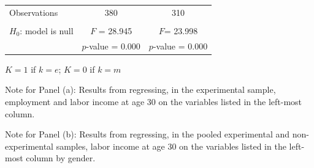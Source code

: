 \begin{table}[!htpb]
\begin{threeparttable}
\begin{tabular}{lcccc}
Observations & \multicolumn{2}{c}{380} & \multicolumn{2}{c}{310} \\ \\
$H_0$: model is null & \multicolumn{2}{c}{$F$ = 28.945} & \multicolumn{2}{c}{$F$= 23.998} \\
& \multicolumn{2}{c}{$p$-value = 0.000} & \multicolumn{2}{c}{$p$-value = 0.000} \\ \bottomrule
\end{tabular}
\begin{tablenotes}
\footnotesize
\item * $K = 1$ if $k = e$; $K = 0$ if $k = m$\\
\item Note for Panel (a): Results from regressing, in the experimental sample, employment and labor income at age 30 on the variables listed in the left-most column. \\
\item Note for Panel (b): Results from regressing, in the pooled experimental and non-experimental  samples, labor income at age 30 on the variables listed in the left-most column by gender. 
\end{tablenotes}
\end{threeparttable}
\end{table}

